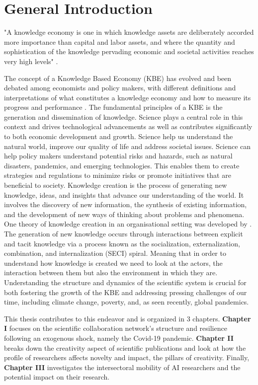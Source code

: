 \chapter*{General Introduction}

"A knowledge economy is one in which knowledge assets are deliberately accorded more importance than capital and labor assets, and where the quantity and sophistication of the knowledge pervading economic and societal activities reaches very high levels" \cite{world2007building}.

The concept of a Knowledge Based Economy (KBE) has evolved and been debated among economists and policy makers, with different definitions and interpretations of what constitutes a knowledge economy and how to measure its progress and performance \citep{powell2004knowledge}. The fundamental principles of a KBE is the generation and dissemination of knowledge. Science plays a central role in this context and drives technological advancements as well as contributes significantly to both economic development and growth. Science help us understand the natural world, improve our quality of life and address societal issues. Science can help policy makers understand potential risks and hazards, such as natural disasters, pandemics, and emerging technologies. This enables them to create strategies and regulations to minimize risks or promote initiatives that are beneficial to society. 
Knowledge creation is the process of generating new knowledge, ideas, and insights that advance our understanding of the world. It involves the discovery of new information, the synthesis of existing information, and the development of new ways of thinking about problems and phenomena. One theory of knowledge creation in an organisational setting was developed by \cite{nonaka2006organizational}. The generation of new knowledge occurs through interactions between explicit and tacit knowledge via a process known as the socialization, externalization, combination, and internalization (SECI) spiral. Meaning that in order to understand how knowledge is created we need to look at the actors, the interaction between them but also the environment in which they are. Understanding the structure and dynamics of the scientific system is crucial for both fostering the growth of the KBE and addressing pressing challenges of our time, including climate change, poverty, and, as seen recently, global pandemics.

This thesis contributes to this endeavor and is organized in 3 chapters. \textbf{Chapter I} focuses on the scientific collaboration network's structure and resilience following an exogenous shock, namely the Covid-19 pandemic. \textbf{Chapter II}  breaks down the creativity aspect of scientific publications and look at how the profile of researchers affects novelty and impact, the pillars of creativity. Finally, \textbf{Chapter III} investigates the intersectoral mobility of AI researchers and the potential impact on their research.

